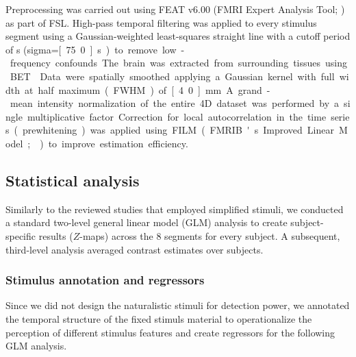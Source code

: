 \documentclass[english]{article}
\begin{document}
Preprocessing was carried out using FEAT v6.00 (FMRI Expert Analysis Tool;
\citep{woolrich2001autocorr}) as part of FSL.
High-pass temporal filtering was applied to every stimulus segment using a
Gaussian-weighted least-squares straight line with a cutoff period of
\unit[150]{s} (sigma=\unit[75.0]{s}) to remove low-frequency confounds.
The brain was extracted from surrounding tissues using BET \citep{smith2002bet}.
Data were spatially smoothed applying a Gaussian kernel with full width at half
maximum (FWHM) of \unit[4.0]{mm}.
A grand-mean intensity normalization of the entire 4D dataset was performed by a
single multiplicative factor.
Correction for local autocorrelation in the time series (prewhitening) was
applied using FILM (FMRIB's Improved Linear Model; \citep{woolrich2001autocorr})
to improve estimation efficiency.


\subsection{Statistical analysis}

Similarly to the reviewed studies that employed simplified stimuli, we conducted
a standard two-level general linear model (GLM) analysis to create
subject-specific results ($Z$-maps) across the 8 segments for every subject. A
subsequent, third-level analysis averaged contrast estimates over subjects.


\subsubsection{Stimulus annotation and regressors}




Since we did not design the naturalistic stimuli for detection power, we
annotated the temporal structure of the fixed stimuls material to operationalize
the perception of different stimulus features and create regressors for the
following GLM analysis.
\end{document}
